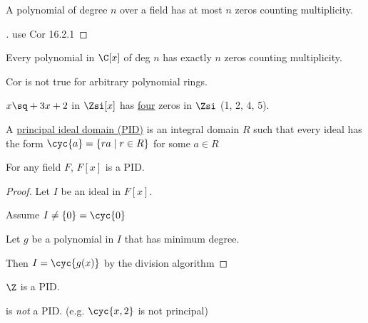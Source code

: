\documentclass[a4paper]{article}
\begin{document}
\begin{corollary}
  A polynomial of degree \( n \) over a field has at most \( n \) zeros counting multiplicity.
\end{corollary}

\begin{proof}[]
  use Cor 16.2.1
\end{proof}

\begin{example}
  Every polynomial in \( \C[x] \) of deg \( n \) has exactly \( n \) zeros counting multiplicity.
\end{example}

Cor is not true for arbitrary polynomial rings.

\begin{example}
  \( x\sq+3x+2 \) in \( \Zsi[x] \) has \uline{four} zeros in \( \Zsi \) (1, 2, 4, 5).
\end{example}

\begin{definition}
  A \uline{principal ideal domain (PID)} is an integral domain \( R \) such that every ideal has the form \( \cyc{a}=\{ra\mid r\in R\} \) for some \( a\in R \)
\end{definition}

\begin{theorem}
  For any field \( F \), \( F[x] \) is a PID.
\end{theorem}

\begin{proof}
  Let \( I \) be an ideal in \( F[x] \).

  Assume \( I\neq \{0\}=\cyc{0} \)

  Let \( g \) be a polynomial in \( I \) that has minimum degree.

  Then \( I=\cyc{g(x)} \) by the division algorithm
\end{proof}

\begin{theorem}
  \( \Z \) is a PID.
\end{theorem}

\begin{example}
  \Z[x] is \emph{not} a PID. (e.g. \( \cyc{x,2} \) is not principal)
\end{example}
\end{document}
